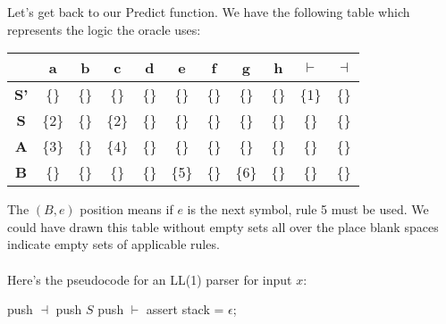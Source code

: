 \documentclass[]{article}
\theoremstyle{definition}
\begin{document}
				Let's get back to our Predict function. We have the following table which represents the logic the oracle uses:
				\begin{center}
					\begin{tabular}{|c|c|c|c|c|c|c|c|c|c|c|}
						\hline
						& \textbf{a} & \textbf{b} & \textbf{c} & \textbf{d} & \textbf{e} & \textbf{f} & \textbf{g} & \textbf{h} & $\boldsymbol \vdash$ & $\boldsymbol \dashv$ \\ \hline
						\textbf{S'} & \{\} & \{\} & \{\} & \{\} & \{\} & \{\} & \{\} & \{\} & \{1\} & \{\} \\
						\textbf{S} & \{2\} & \{\} & \{2\} & \{\} & \{\} & \{\} & \{\} & \{\} & \{\} & \{\} \\
						\textbf{A} & \{3\} & \{\} & \{4\} & \{\} & \{\} & \{\} & \{\} & \{\} & \{\} & \{\} \\
						\textbf{B} & \{\} & \{\} & \{\} & \{\} & \{5\} & \{\} & \{6\} & \{\} & \{\} & \{\} \\ \hline
					\end{tabular}
				\end{center}
				
				The $(B, e)$ position means if $e$ is the next symbol, rule 5 must be used. We could have drawn this table without empty sets all over the place \textendash{} blank spaces indicate empty sets of applicable rules.
				\\ \\
				Here's the pseudocode for an LL(1) parser for input $x$: \\
				\begin{algorithm}[H]
					push $\dashv$\;
					push $S$\;
					push $\vdash$\;
					assert stack = $\epsilon$;
				\end{algorithm}
\end{document}
